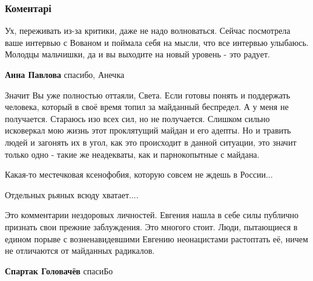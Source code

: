  
 
 
 
 
\subsubsection{Коментарі}

\begin{itemize} %

Ух, переживать из-за критики, даже не надо волноваться. Сейчас посмотрела ваше
интервью с Вованом и поймала себя на мысли, что все интервью улыбаюсь. Молодцы
мальчишки, да и вы выходите на новый уровень - это радует.

\begin{itemize} %
\textbf{Анна Павлова} спасибо, Анечка
\end{itemize} %


Значит Вы уже полностью оттаяли, Света. Если готовы понять и поддержать
человека, который в своё время топил за майданный беспредел. А у меня не
получается. Стараюсь изо всех сил, но не получается. Слишком сильно исковеркал
мою жизнь этот проклятущий майдан и его адепты. Но и травить людей и загонять
их в угол, как это происходит в данной ситуации, это значит только одно - такие
же неадекваты, как и парнокопытные с майдана.


Какая-то местечковая ксенофобия, которую совсем не ждешь в России...

Отдельных рьяных всюду хватает....


Это комментарии нездоровых личностей. Евгения нашла в себе силы публично
признать свои прежние заблуждения. Это многого стоит. Люди, пытающиеся в едином
порыве с возненавидевшими Евгению неонацистами растоптать её, ничем не
отличаются от майданных радикалов.

\begin{itemize} %
\textbf{Спартак Головачёв} спасиБо
\end{itemize} %


\end{itemize}
